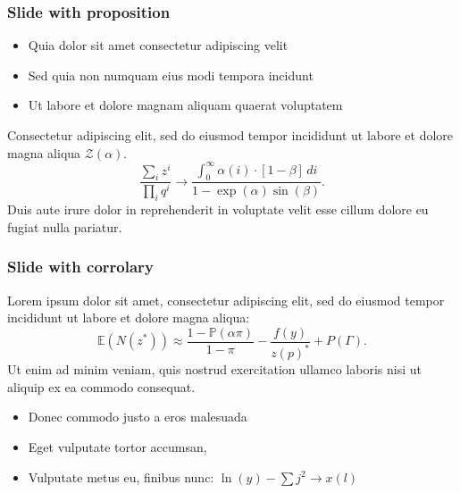 \documentclass[11pt, xcolor={dvipsnames}, usepdftitle=false]{beamer}
\begin{document}
\begin{frame}
\frametitle{Slide with proposition}
\begin{itemize}
\item Quia dolor sit amet consectetur adipiscing velit
\item Sed quia non numquam eius modi tempora incidunt
\item Ut labore et dolore magnam aliquam quaerat voluptatem
\end{itemize}
\begin{proposition}
Consectetur adipiscing elit, sed do eiusmod tempor incididunt ut labore et dolore magna aliqua $\mathcal{Z}(\alpha)$. 
\begin{equation*}
\frac{\sum_i z^i}{\prod_i q^i} \to \frac{\int_{0}^{\infty} \alpha(i) \cdot [1-\beta]\,di}{1-\exp(\alpha)\sin(\beta)}.
\end{equation*}
Duis aute irure dolor in reprehenderit in voluptate velit esse cillum dolore eu fugiat nulla pariatur. 
\end{proposition}
\end{frame}

\begin{frame}
\frametitle{Slide with corrolary}
\begin{corollary}
Lorem ipsum dolor sit amet, consectetur adipiscing elit, sed do eiusmod tempor incididunt ut labore et dolore magna aliqua:
\begin{equation*}
\mathbb{E}(N(z^*)) \approx \frac{1-\mathbb{P}(\alpha\pi)}{1-\pi}- \frac{f(y)}{z(p)^*} + P(\Gamma).
\end{equation*}
Ut enim ad minim veniam, quis nostrud exercitation ullamco laboris nisi ut aliquip ex ea commodo consequat.
\end{corollary}
\begin{itemize}
\item Donec commodo justo a eros malesuada
\item Eget vulputate tortor accumsan, 
\item Vulputate metus eu, finibus nunc: $\ln(y) - \sum j^2 \to x(l)$
\end{itemize}
\end{frame}

\begin{frame}
\end{frame}
\end{document}
